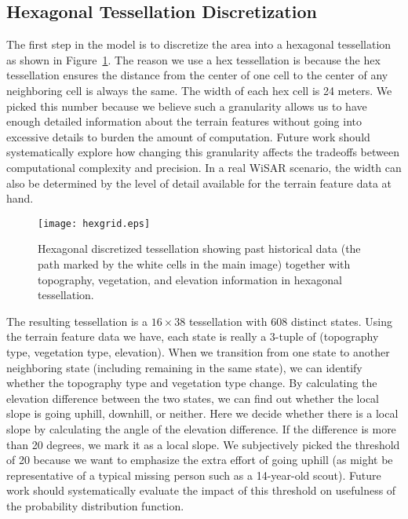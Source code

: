 \subsection{Hexagonal Tessellation Discretization}
\label{sec:3.3}

The first step in the model is to discretize the area into a hexagonal tessellation as shown in Figure~\ref{hexgrid}. The reason we use a hex tessellation is because the hex tessellation ensures the distance from the center of one cell to the center of any neighboring cell is always the same. The width of each hex cell is 24 meters. We picked this number because we believe such a granularity allows us to have enough detailed information about the terrain features without going into excessive details to burden the amount of computation. Future work should systematically explore how changing this granularity affects the tradeoffs between computational complexity and precision. In a real WiSAR scenario, the width can also be determined by the level of detail available for the terrain feature data at hand.

\begin{figure}
\centering
\texttt{[image: hexgrid.eps]}
\caption[Hexagonal discretized tessellation showing past historical data]{Hexagonal discretized tessellation showing past historical data (the path marked by the white cells in the main image) together with topography, vegetation, and elevation information in hexagonal tessellation.}
\label{hexgrid}
\end{figure}

The resulting tessellation is a $16 \times 38$ tessellation with 608 distinct states. Using the terrain feature data we have, each state is really a 3-tuple of (topography type, vegetation type, elevation). When we transition from one state to another neighboring state (including remaining in the same state), we can identify whether the topography type and vegetation type change. By calculating the elevation difference between the two states, we can find out whether the local slope is going uphill, downhill, or neither. Here we decide whether there is a local slope by calculating the angle of the elevation difference. If the difference is more than 20 degrees, we mark it as a local slope. We subjectively picked the threshold of 20 because we want to emphasize the extra effort of going uphill (as might be representative of a typical missing person such as a 14-year-old scout). Future work should systematically evaluate the impact of this threshold on usefulness of the probability distribution function.

